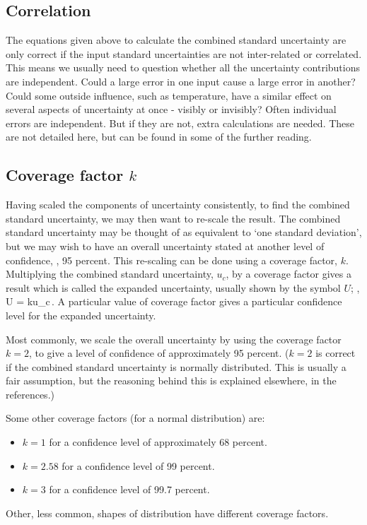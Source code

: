 \subsection{Correlation}
The equations given above to calculate the combined standard uncertainty are only correct if the input standard uncertainties are not inter-related or correlated. This means we usually need to question whether all the uncertainty contributions are independent. Could a large error in one input cause a large error in another? Could some outside influence, such as temperature, have a similar effect on several aspects of uncertainty at once - visibly or invisibly? Often individual errors are independent. But if they are not, extra calculations are needed. These are not detailed here, but can be found in some of the further reading.


\subsection{Coverage factor $k$}
Having scaled the components of uncertainty consistently, to find the combined standard uncertainty, we may then want to re-scale the result. The combined standard uncertainty may be thought of as equivalent to `one standard deviation', but we may wish to have an overall uncertainty stated at another level of confidence, \eg, 95 percent. This re-scaling can be done using a coverage factor, $k$. Multiplying the combined standard uncertainty, $u_c$, by a coverage factor gives a result which is called the expanded uncertainty, usually shown by the symbol $U$; \ie,
\beq
U = ku_c\,.
\eeq
A particular value of coverage factor gives a particular confidence level for the expanded uncertainty.

Most commonly, we scale the overall uncertainty by using the coverage factor $k = 2$, to give a level of confidence of approximately 95 percent. ($k = 2$ is correct if the combined standard uncertainty is normally distributed. This is usually a fair assumption, but the reasoning behind this is explained elsewhere, in the references.)

Some other coverage factors (for a normal distribution) are:
\begin{itemize}
\item $k = 1$ for a confidence level of approximately 68 percent. 
\item $k = 2.58$ for a confidence level of 99 percent.
\item $k = 3$ for a confidence level of 99.7 percent.
\end{itemize}
Other, less common, shapes of distribution have different coverage factors.

